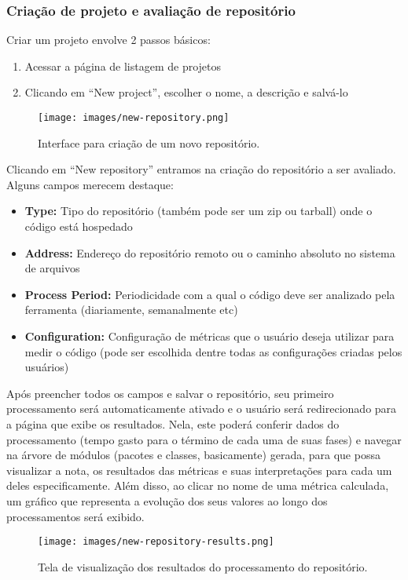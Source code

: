 \documentclass[10pt]{article}
\begin{document}
    \subsubsection{Criação de projeto e avaliação de repositório}
    Criar um projeto envolve 2 passos básicos:
    \begin{enumerate}
      \item Acessar a página de listagem de projetos
      \item Clicando em ``New project'', escolher o nome, a descrição e salvá-lo
    \end{enumerate}
    \begin{figure}[H]
      \centering
      \texttt{[image: images/new-repository.png]}
      \caption{Interface para criação de um novo repositório.}
      \label{fig:choose-metric}
    \end{figure}

    Clicando em ``New repository'' entramos na criação do repositório a ser avaliado. Alguns campos merecem destaque:
    \begin{itemize}
      \item\textbf{Type:} Tipo do repositório (também pode ser um zip ou tarball) onde o código está hospedado
      \item\textbf{Address:} Endereço do repositório remoto ou o caminho absoluto no sistema de arquivos
      \item\textbf{Process Period:} Periodicidade com a qual o código deve ser analizado pela ferramenta (diariamente, semanalmente etc)
      \item\textbf{Configuration:} Configuração de métricas que o usuário deseja utilizar para medir o código (pode ser escolhida dentre todas as configurações criadas pelos usuários)
    \end{itemize}
    Após preencher todos os campos e salvar o repositório, seu primeiro processamento será automaticamente ativado e o usuário será redirecionado para a página que exibe os resultados. Nela, este poderá conferir dados do processamento (tempo gasto para o término de cada uma de suas fases) e navegar na árvore de módulos (pacotes e classes, basicamente) gerada, para que possa visualizar a nota, os resultados das métricas e suas interpretações para cada um deles especificamente. Além disso, ao clicar no nome de uma métrica calculada, um gráfico que representa a evolução dos seus valores ao longo dos processamentos será exibido.

    \begin{figure}[H]
      \centering
      \texttt{[image: images/new-repository-results.png]}
      \caption{Tela de visualização dos resultados do processamento do repositório.}
      \label{fig:choose-metric}
    \end{figure}
\end{document}
